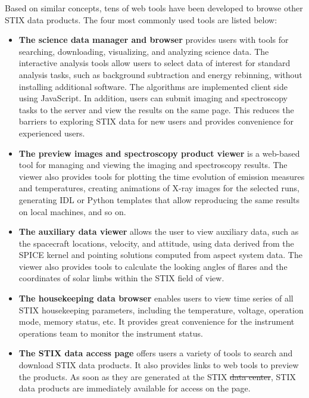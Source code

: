\documentclass[referee]{aa} %
\providecommand{\DIFaddtex}[1]{{\protect\color{blue}\uwave{#1}}} %
\providecommand{\DIFdeltex}[1]{{\protect\color{red}\sout{#1}}}                      %
\providecommand{\DIFaddbegin}{} %
\providecommand{\DIFaddend}{} %
\providecommand{\DIFdelbegin}{} %
\providecommand{\DIFdelend}{} %
\providecommand{\DIFadd}[1]{\texorpdfstring{\DIFaddtex{#1}}{#1}} %
\providecommand{\DIFdel}[1]{\texorpdfstring{\DIFdeltex{#1}}{}} %
\newcommand{\DIFscaledelfig}{0.5}
\newlength{\DIFdelgraphicswidth} %
\newlength{\DIFdelgraphicsheight} %
\newcommand{\DIFaddincludegraphics}[2][]{{\color{blue}\fbox{\DIFOincludegraphics[#1]{#2}}}} %
\newcommand{\DIFdelincludegraphics}[2][]{%
\sbox{\DIFdelgraphicsbox}{\DIFOincludegraphics[#1]{#2}}%
\settoboxwidth{\DIFdelgraphicswidth}{\DIFdelgraphicsbox} %
\settoboxtotalheight{\DIFdelgraphicsheight}{\DIFdelgraphicsbox} %
\scalebox{\DIFscaledelfig}{%
\parbox[b]{\DIFdelgraphicswidth}{\usebox{\DIFdelgraphicsbox}\\[-\baselineskip] \rule{\DIFdelgraphicswidth}{0em}}\llap{\resizebox{\DIFdelgraphicswidth}{\DIFdelgraphicsheight}{%
\setlength{\unitlength}{\DIFdelgraphicswidth}%
\begin{picture}(1,1)%
\thicklines\linethickness{2pt} %
{\color[rgb]{1,0,0}\put(0,0){\framebox(1,1){}}}%
{\color[rgb]{1,0,0}\put(0,0){\line( 1,1){1}}}%
{\color[rgb]{1,0,0}\put(0,1){\line(1,-1){1}}}%
\end{picture}%
}\hspace*{3pt}}} %
} %
\DeclareRobustCommand{\DIFaddbegin}{\DIFOaddbegin \let\includegraphics\DIFaddincludegraphics} %
\DeclareRobustCommand{\DIFaddend}{\DIFOaddend \let\includegraphics\DIFOincludegraphics} %
\DeclareRobustCommand{\DIFdelbegin}{\DIFOdelbegin \let\includegraphics\DIFdelincludegraphics} %
\DeclareRobustCommand{\DIFdelend}{\DIFOaddend \let\includegraphics\DIFOincludegraphics} %
\begin{document}
Based on similar concepts, tens of web tools have been developed to browse other STIX data products. The four most commonly used tools are listed below: 
\begin{itemize}
  \item  {\bf The science data manager and browser} provides users with tools for searching, downloading, visualizing, and analyzing science data. The interactive analysis tools allow users to select data of interest for standard analysis tasks, such as background subtraction and energy rebinning,  without installing additional software. 
  The algorithms are implemented client side using JavaScript. In addition, users can submit imaging and spectroscopy tasks to the server and view the results on the same page. This reduces the barriers to exploring STIX data for new users and provides convenience for experienced users.

  \item  {\bf The preview images and spectroscopy product viewer} is a web-based tool for managing and viewing the imaging and spectroscopy results. The viewer also provides tools for plotting the time evolution of emission measures and temperatures,  creating animations of X-ray images for the selected runs, generating IDL or Python templates that allow reproducing the same results on local machines, and so on. 
  \item {\bf The auxiliary data viewer} allows the user to view auxiliary data, such as the spacecraft locations, velocity, and attitude, using data derived from the SPICE kernel and  pointing solutions computed from aspect system data.
  The viewer also provides tools to calculate the looking angles of flares and the coordinates of solar limbs within the STIX field of view.
  \item  {\bf The housekeeping data browser} enables users to view time series of all STIX housekeeping parameters, including the temperature, voltage, operation mode, memory status, etc. It provides great convenience for the instrument operations team to monitor the instrument status. 
\item {\bf The STIX data access page} offers users a variety of tools to search and download STIX data products. 
It also provides links to web tools to preview the products. As soon as they are generated at the STIX \DIFdelbegin \DIFdel{data center}\DIFdelend \DIFaddbegin \DIFadd{Data Center}\DIFaddend , STIX data products are immediately available for access on the page.
\end{itemize}
\end{document}
